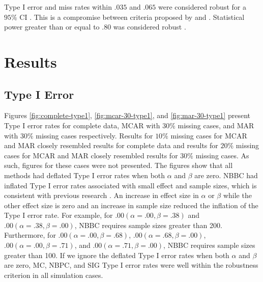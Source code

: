 \documentclass[man]{apa7}\usepackage[]{graphicx}\usepackage[]{xcolor}
\begin{document}
Type I error and miss rates within $.035$ and $.065$ were considered robust for a $95\%$ CI
\parencite{Lib-Simulation-Robustness-Serlin-2000}.
This is a compromise between criteria proposed by
\Textcite{Lib-Simulation-Robustness-Cochran-1952}
and
\Textcite{Lib-Simulation-Robustness-Bradley-1978}.
Statistical power greater than or equal to
$.80$
was considered robust
\parencite{Lib-NHST-Power-Books-Cohen-1988}.

\section{Results}

\subsection{Type I Error}

Figures
\ref{fig:complete-type1},
\ref{fig:mcar-30-type1},
and
\ref{fig:mar-30-type1}
present Type I error rates
for complete data,
MCAR with $30\%$ missing cases,
and MAR with $30\%$ missing cases
respectively.
Results for $10\%$ missing cases for MCAR and MAR closely resembled
results for complete data and
results for $20\%$ missing cases for MCAR and MAR closely resembled
results for $30\%$ missing cases.
As such,
figures for these cases were not presented.
The figures show that all methods had deflated Type I error rates when both ${\alpha}$ and ${\beta}$ are zero.
NBBC had inflated Type I error rates associated with small effect and sample sizes,
which is consistent with previous research
\parencite[e.g.,][]{Lib-Mediation-Monte-Carlo-Method-MacKinnon-2004,
Lib-Mediation-Bootstrap-Biesanz-2010,
Lib-Mediation-Bootstrap-Hayes-2013,
Lib-Mediation-Bootstrap-Tofighi-2020}.
An increase in effect size in ${\alpha}$ or ${\beta}$ while the other effect size is zero and an increase in sample size reduced the inflation of the Type I error rate.
For example,
for $.00 \left( \alpha = .00, \beta = .38 \right)$ and $.00 \left( \alpha = .38, \beta = .00 \right)$,
NBBC requires sample sizes greater than 200.
Furthermore,
for $.00 \left( \alpha = .00, \beta = .68 \right)$,
$.00 \left( \alpha = .68, \beta = .00 \right)$,
$.00 \left( \alpha = .00, \beta = .71 \right)$, and
$.00 \left( \alpha = .71, \beta = .00 \right)$,
NBBC requires sample sizes greater than 100.
If we ignore the deflated Type I error rates when both ${\alpha}$ and ${\beta}$ are zero,
MC,
NBPC,
and SIG Type I error rates were well within the robustness criterion in all simulation cases.
\end{document}
